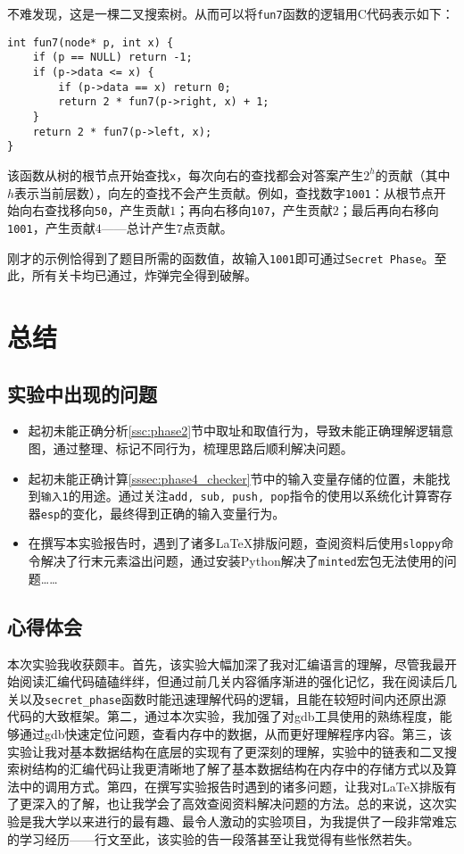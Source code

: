 \documentclass[a4paper, 11pt]{ctexart}
\let\oldsection\section
\renewcommand{\section}{\clearpage\oldsection}
\begin{document}
不难发现，这是一棵二叉搜索树。从而可以将\texttt{fun7}函数的逻辑用C代码表示如下：

\begin{verbatim}
int fun7(node* p, int x) {
    if (p == NULL) return -1;
    if (p->data <= x) {
        if (p->data == x) return 0;
        return 2 * fun7(p->right, x) + 1;
    }
    return 2 * fun7(p->left, x);
}
\end{verbatim}

该函数从树的根节点开始查找\texttt{x}，每次向右的查找都会对答案产生$2^{h}$的贡献（其中$h$表示当前层数），向左的查找不会产生贡献。例如，查找数字\texttt{1001}：从根节点开始向右查找移向\texttt{50}，产生贡献$1$；再向右移向\texttt{107}，产生贡献$2$；最后再向右移向\texttt{1001}，产生贡献$4$——总计产生$7$点贡献。

刚才的示例恰得到了题目所需的函数值，故输入\texttt{1001}即可通过\texttt{Secret Phase}。至此，所有关卡均已通过，炸弹完全得到破解。

\section{总结}
\subsection{实验中出现的问题}
\begin{itemize}
    \item 起初未能正确分析\ref{ssc:phase2}节中取址和取值行为，导致未能正确理解逻辑意图，通过整理、标记不同行为，梳理思路后顺利解决问题。
    \item 起初未能正确计算\ref{sssec:phase4_checker}节中的输入变量存储的位置，未能找到\texttt{输入1}的用途。通过关注\texttt{add, sub, push, pop}指令的使用以系统化计算寄存器\texttt{esp}的变化，最终得到正确的输入变量行为。
    \item 在撰写本实验报告时，遇到了诸多\LaTeX{}排版问题，查阅资料后使用\texttt{sloppy}命令解决了行末元素溢出问题，通过安装Python解决了\texttt{minted}宏包无法使用的问题……
\end{itemize}

\subsection{心得体会}
本次实验我收获颇丰。首先，该实验大幅加深了我对汇编语言的理解，尽管我最开始阅读汇编代码磕磕绊绊，但通过前几关内容循序渐进的强化记忆，我在阅读后几关以及\texttt{secret\_phase}函数时能迅速理解代码的逻辑，且能在较短时间内还原出源代码的大致框架。第二，通过本次实验，我加强了对gdb工具使用的熟练程度，能够通过gdb快速定位问题，查看内存中的数据，从而更好理解程序内容。第三，该实验让我对基本数据结构在底层的实现有了更深刻的理解，实验中的链表和二叉搜索树结构的汇编代码让我更清晰地了解了基本数据结构在内存中的存储方式以及算法中的调用方式。第四，在撰写实验报告时遇到的诸多问题，让我对\LaTeX{}排版有了更深入的了解，也让我学会了高效查阅资料解决问题的方法。总的来说，这次实验是我大学以来进行的最有趣、最令人激动的实验项目，为我提供了一段非常难忘的学习经历——行文至此，该实验的告一段落甚至让我觉得有些怅然若失。
\end{document}
